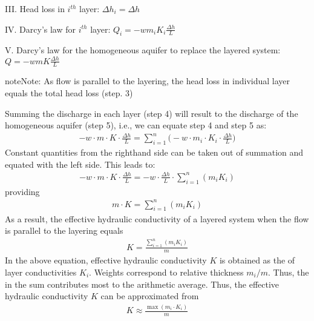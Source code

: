 \documentclass[letterpaper,10pt,english]{jupyterBook}
\begin{document}
\sphinxAtStartPar
III. Head loss in \(i^{th}\) layer: \(\Delta h_i = \Delta h\)

\sphinxAtStartPar
IV. Darcy’s law for \(i^{th}\) layer: \(Q_i = - wm_iK_i\frac{\Delta h}{L} \)

\sphinxAtStartPar
V. Darcy’s law for the homogeneous aquifer to replace the layered system: \(Q = -wmK\frac{\Delta h}{L}\)

\begin{sphinxadmonition}{note}{Note:}
\sphinxAtStartPar
As flow is parallel to the layering, the head loss in individual layer equals the total head loss (step. 3)
\end{sphinxadmonition}

\sphinxAtStartPar
Summing the discharge in each layer (step 4) will result to the discharge of the homogeneous aquifer (step 5), i.e., we can equate step 4 and step 5 as:
\begin{equation*}
\begin{split}
- w \cdot m \cdot K \cdot \frac{\Delta h}{L} = \sum\limits_{i=1}^n\bigg(- w \cdot m_i \cdot K_i\cdot\frac{\Delta h}{L}\bigg)
\end{split}
\end{equation*}
\sphinxAtStartPar
Constant quantities from the right\sphinxhyphen{}hand side can be taken out of summation and equated with the left side. This leads to:
\begin{equation*}
\begin{split}
{- w}\cdot m \cdot K \cdot \frac{\Delta h}{L} = {- w} \cdot \frac{\Delta h}{L} \cdot \sum\limits_{i=1}^n( m_iK_i)
\end{split}
\end{equation*}
\sphinxAtStartPar
providing
\begin{equation*}
\begin{split}
m\cdot K = \sum\limits_{i=1}^n( m_iK_i)
\end{split}
\end{equation*}
\sphinxAtStartPar
As a result, the effective hydraulic conductivity of a layered system when the flow is parallel to the layering equals
\begin{equation*}
\begin{split}
K = \frac{\sum\limits_{i=1}^n(m_i K_i)}{m}
\end{split}
\end{equation*}
\sphinxAtStartPar
In the above equation, effective hydraulic conductivity \(K\) is obtained as the  of layer conductivities \(K_i\). Weights correspond to relative thickness \(m_i/m\). Thus, the  in the sum contributes most to the arithmetic average. Thus, the effective hydraulic conductivity \(K\) can be approximated from
\begin{equation*}
\begin{split}
K \approx \frac{\max (m_i\cdot K_i)}{m}
\end{split}
\end{equation*}
\end{document}
